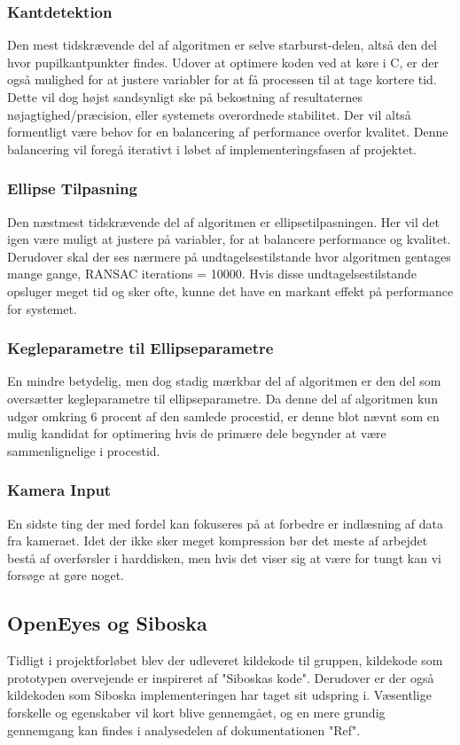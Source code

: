 \documentclass[rapport.tex]{subfiles}
\begin{document}
	\subsubsection{Kantdetektion}
	Den mest tidskrævende del af algoritmen er selve starburst-delen, altså den del hvor pupilkantpunkter findes. Udover at optimere koden ved at køre i C, er der også mulighed for at justere variabler for at få processen til at tage kortere tid. Dette vil dog højst sandsynligt ske på bekostning af resultaternes nøjagtighed/præcision, eller systemets overordnede stabilitet. Der vil altså formentligt være behov for en balancering af performance overfor kvalitet. Denne balancering vil foregå iterativt i løbet af implementeringsfasen af projektet.
	
	\subsubsection{Ellipse Tilpasning}
	Den næstmest tidskrævende del af algoritmen er ellipsetilpasningen. Her vil det igen være muligt at justere på variabler, for at balancere performance og kvalitet. Derudover skal der ses nærmere på undtagelsestilstande hvor algoritmen gentages mange gange, RANSAC iterations = 10000. Hvis disse undtagelsestilstande opsluger meget tid og sker ofte, kunne det have en markant effekt på performance for systemet.
	
	\subsubsection{Kegleparametre til Ellipseparametre}
	En mindre betydelig, men dog stadig mærkbar del af algoritmen er den del som oversætter kegleparametre til ellipseparametre. Da denne del af algoritmen kun udgør omkring 6 procent af den samlede procestid, er denne blot nævnt som en mulig kandidat for optimering hvis de primære dele begynder at være sammenlignelige i procestid. 
	
	\subsubsection{Kamera Input}
	En sidste ting der med fordel kan fokuseres på at forbedre er indlæsning af data fra kameraet. Idet der ikke sker meget kompression bør det meste af arbejdet bestå af overførsler i harddisken, men hvis det viser sig at være for tungt kan vi forsøge at gøre noget.
	\subsection{OpenEyes og Siboska}
	Tidligt i projektforløbet blev der udleveret kildekode til gruppen, kildekode som prototypen overvejende er inspireret af "Siboskas kode". Derudover er der også kildekoden som Siboska implementeringen har taget sit
	udspring i. Væsentlige forskelle og egenskaber vil kort blive gennemgået, og en mere grundig gennemgang kan findes i analysedelen af dokumentationen "Ref".
	
\end{document}
